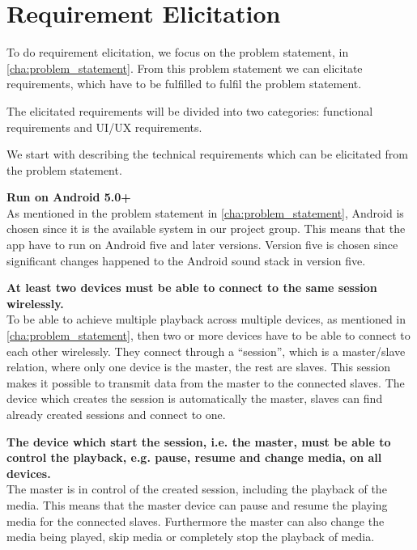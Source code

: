 \section{Requirement Elicitation}
To do requirement elicitation, we focus on the problem statement, in \cref{cha:problem_statement}.
From this problem statement we can elicitate requirements, which have to be fulfilled to fulfil the problem statement.

The elicitated requirements will be divided into two categories: functional requirements and UI/UX requirements.

We start with describing the technical requirements which can be elicitated from the problem statement.

\begin{eletterate}
    \item \textbf{Run on Android 5.0+} \hfill\\
        As mentioned in the problem statement in \cref{cha:problem_statement}, Android is chosen since it is the available system in our project group.
        This means that the app have to run on Android five and later versions.
        Version five is chosen since significant changes happened to the Android sound stack in version five\cite{android_5_sound_stack}.

    \item \textbf{At least two devices must be able to connect to the same session wirelessly.} \hfill\\
        To be able to achieve multiple playback across multiple devices, as mentioned in \cref{cha:problem_statement},
        then two or more devices have to be able to connect to each other wirelessly.
        They connect through a ``session'', which is a master/slave relation, where only one device is the master, the rest are slaves.
        This session makes it possible to transmit data from the master to the connected slaves.
        The device which creates the session is automatically the master, slaves can find already created sessions and connect to one.

    \item \textbf{The device which start the session, i.e. the master, must be able to control the playback, e.g. pause, resume and change media, on all devices.} \hfill\\
        The master is in control of the created session, including the playback of the media.
        This means that the master device can pause and resume the playing media for the connected slaves.
        Furthermore the master can also change the media being played, skip media or completely stop the playback of media.


\end{eletterate}
